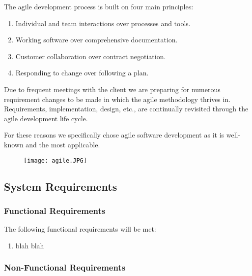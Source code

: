 	\begin{flushleft}
	The agile development process is built on four main principles:
		\begin{enumerate}
			\item Individual and team interactions over processes and tools.
			\item Working software over comprehensive documentation.
			\item Customer collaboration over contract negotiation.
			\item Responding to change over following a plan.
		\end{enumerate}
	\end{flushleft}

\begin{flushleft}
Due to frequent meetings with the client we are preparing for numerous requirement changes to be made in which the agile methodology thrives in. Requirements, implementation, design, etc., are continually revisited through the agile development life cycle.

\bigskip

For these reasons we specifically chose agile software development as it is well-known and the most applicable.
\end{flushleft}

	\begin{figure}[H]
			\centering
			\texttt{[image: agile.JPG]}
	\end{figure}

\subsection{System Requirements}

	\subsubsection{Functional Requirements}

	The following functional requirements will be met:

	\begin{enumerate}
			\item blah blah
	\end{enumerate}

	\subsubsection{Non-Functional Requirements}

